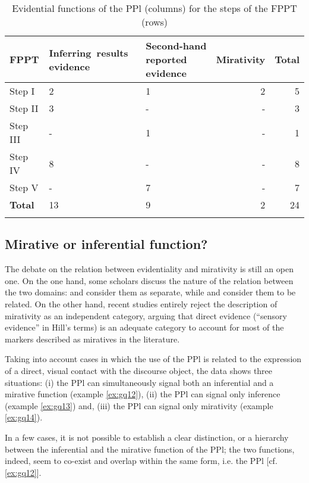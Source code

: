 \documentclass[output=paper]{langsci/langscibook}
\begin{document}
\begin{table}
\begin{tabularx}{\textwidth}{lYYrr}
\lsptoprule
 \textbf{FPPT} & \textbf{\mbox{Inferring results} evidence} & \textbf{Second-hand reported evidence} & \textbf{Mirativity} & \textbf{Total}\\
\midrule
Step I & 2 & 1 & 2 & 5\\
Step II & 3 & {-} & {-} & 3\\
Step III & {-} & 1 & {-} & 1\\
Step IV & 8 & {-} & {-} & 8\\
Step V & {-} & 7 & {-} & 7\\
\hline
\textbf{Total} & 13 & 9 & 2 & 24\\
\lspbottomrule
\end{tabularx}
\caption{Evidential functions of the PPl (columns) for the steps of the FPPT (rows)}\label{tab:gq2}
\end{table}


\subsection{Mirative or inferential function?}\label{s:gq4-1}

The debate on the relation between evidentiality and mirativity is still an open one. On the one hand, some scholars discuss the nature of the relation between the two domains: \citet{DeLancey1997} and \citet{Aikhenvald2004} consider them as separate, while \citet{Lazard1999} and \citet{Haan2012} consider them to be related. On the other hand, recent studies \citep{Hill2012} entirely reject the description of mirativity as an independent category, arguing that direct evidence (“sensory evidence” in Hill’s terms) is an adequate category to account for most of the markers described as miratives in the literature. 

Taking into account cases in which the use of the PPl is related to the expression of a direct, visual contact with the discourse object, the data shows three situations: (i) the PPl can simultaneously signal both an inferential and a mirative function (example \ref{ex:gq12}), (ii) the PPl can signal only inference (example \ref{ex:gq13}) and, (iii) the PPl can signal only mirativity (example \ref{ex:gq14}).

In a few cases, it is not possible to establish a clear distinction, or a hierarchy between the inferential \citep{Willett1988} and the mirative function of the PPl; the two functions, indeed, seem to co-exist and overlap within the same form, i.e. the PPl [cf. \ref{ex:gq12}]. 
\end{document}
